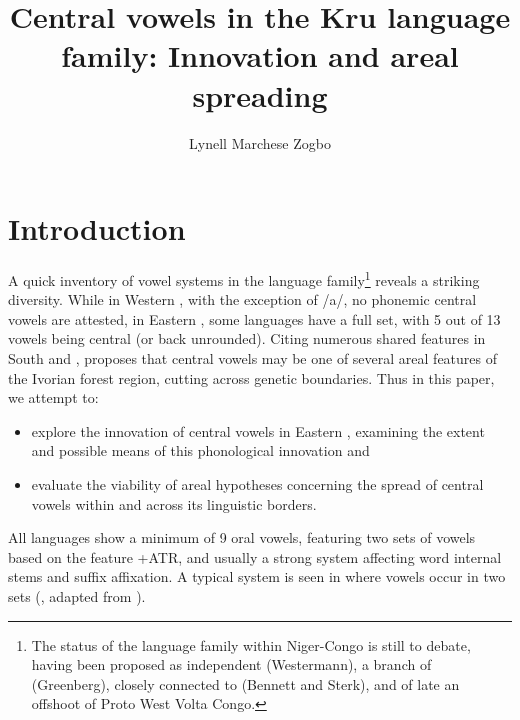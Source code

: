 \documentclass[output=paper,newtxmath,modfonts,nonflat,draft]{langsci/langscibook}
\title{Central vowels in the Kru language family: Innovation and areal spreading}
\author{Lynell Marchese Zogbo\affiliation{University of the Free State; Institut de Linguistique Appliquée, Abidjan}}
\begin{document}
\maketitle 
\section{Introduction}\label{sec:zogbo:1} 

A quick inventory of vowel systems in the  language family\footnote{The status of the  language family within Niger-Congo is still  to debate, having been proposed as independent (Westermann), a branch of  (Greenberg), closely connected to  (Bennett and Sterk), and of late \citep[18]{Williamson2000} an offshoot of Proto West Volta Congo.} reveals a striking diversity.  While in Western , with the exception of /a/, no phonemic central vowels are attested, in Eastern , some languages have a full set, with 5 out of 13 vowels being central (or back unrounded). Citing numerous shared features in South  and , \citet{Vydrine2009} proposes that central vowels may be one of several areal features of the Ivorian forest region, cutting across genetic boundaries.  Thus in this paper, we attempt to:

\begin{itemize}
\item explore the innovation of central vowels in Eastern , examining the extent and possible means of this phonological innovation and \\[-0.75cm]
\item evaluate the viability of areal hypotheses concerning the spread of central vowels within  and across its linguistic borders. 
\end{itemize}

\largerpage[2]
All  languages show a minimum of 9 oral vowels, featuring two sets of vowels based on the feature +ATR, and usually a strong  system affecting word internal stems and suffix affixation. A typical system is seen in  where vowels occur in two sets (, adapted from \citealt[50]{Saunders2009}).
\end{document}
